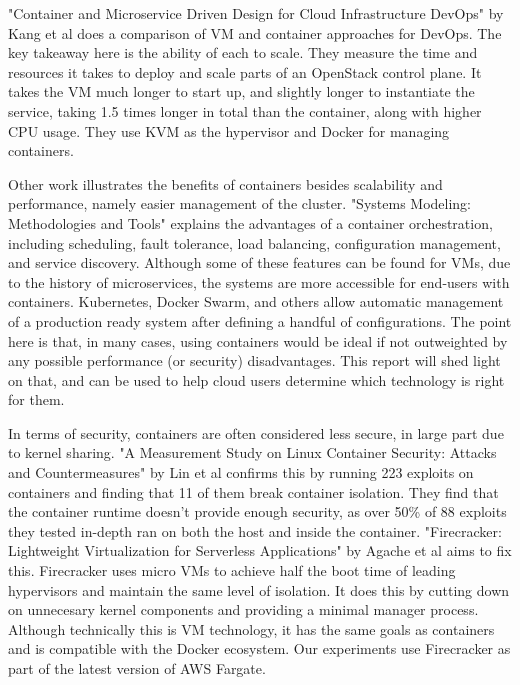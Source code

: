 \documentclass[11pt]{article}
\begin{document}
"Container and Microservice Driven Design for Cloud Infrastructure DevOps" by Kang et al does a comparison of VM and container approaches for DevOps. The key takeaway here is the ability of each to scale. They measure the time and resources it takes to deploy and scale parts of an OpenStack control plane. It takes the VM much longer to start up, and slightly longer to instantiate the service, taking 1.5 times longer in total than the container, along with higher CPU usage. They use KVM as the hypervisor and Docker for managing containers.

Other work illustrates the benefits of containers besides scalability and performance, namely easier management of the cluster. "Systems Modeling: Methodologies and Tools" explains the advantages of a container orchestration, including scheduling, fault tolerance, load balancing, configuration management, and service discovery. Although some of these features can be found for VMs, due to the history of microservices, the systems are more accessible for end-users with containers. Kubernetes, Docker Swarm, and others allow automatic management of a production ready system after defining a handful of configurations. The point here is that, in many cases, using containers would be ideal if not outweighted by any possible performance (or security) disadvantages. This report will shed light on that, and can be used to help cloud users determine which technology is right for them.

In terms of security, containers are often considered less secure, in large part due to kernel sharing. "A Measurement Study on Linux Container Security: Attacks and
Countermeasures" by Lin et al confirms this by running 223 exploits on containers and finding that 11 of them break container isolation. They find that the container runtime doesn't provide enough security, as over 50\% of 88 exploits they tested in-depth ran on both the host and inside the container. "Firecracker: Lightweight Virtualization
for Serverless Applications" by Agache et al aims to fix this. Firecracker uses micro VMs to achieve half the boot time of leading hypervisors and maintain the same level of isolation. It does this by cutting down on unnecesary kernel components and providing a minimal manager process. Although technically this is VM technology, it has the same goals as containers and is compatible with the Docker ecosystem. Our experiments use Firecracker as part of the latest version of AWS Fargate.

\vspace{3mm} %
\end{document}
